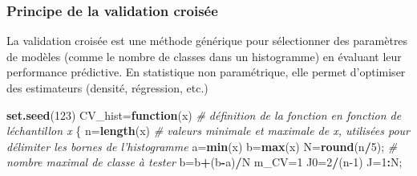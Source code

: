 \documentclass[
  12pt,
]{article}
\newenvironment{Shaded}{\begin{snugshade}}{\end{snugshade}}
\newcommand{\CommentTok}[1]{\textcolor[rgb]{0.56,0.35,0.01}{\textit{#1}}}
\newcommand{\ControlFlowTok}[1]{\textcolor[rgb]{0.13,0.29,0.53}{\textbf{#1}}}
\newcommand{\DecValTok}[1]{\textcolor[rgb]{0.00,0.00,0.81}{#1}}
\newcommand{\FunctionTok}[1]{\textcolor[rgb]{0.13,0.29,0.53}{\textbf{#1}}}
\newcommand{\NormalTok}[1]{#1}
\newcommand{\OtherTok}[1]{\textcolor[rgb]{0.56,0.35,0.01}{#1}}
\newcommand{\SpecialCharTok}[1]{\textcolor[rgb]{0.81,0.36,0.00}{\textbf{#1}}}
\begin{document}
\subsubsection{Principe de la validation
croisée}\label{principe-de-la-validation-croisuxe9e}

La validation croisée est une méthode générique pour sélectionner des
paramètres de modèles (comme le nombre de classes dans un histogramme)
en évaluant leur performance prédictive. En statistique non
paramétrique, elle permet d'optimiser des estimateurs (densité,
régression, etc.)

\begin{Shaded}
\begin{Highlighting}[]
\FunctionTok{set.seed}\NormalTok{(}\DecValTok{123}\NormalTok{)}
\NormalTok{CV\_hist}\OtherTok{=}\ControlFlowTok{function}\NormalTok{(x) }\CommentTok{\# définition de la fonction en fonction de l\textquotesingle{}échantillon x}
\NormalTok{\{}
\NormalTok{  n}\OtherTok{=}\FunctionTok{length}\NormalTok{(x)}
  \CommentTok{\# valeurs minimale et maximale de x, utilisées pour délimiter les bornes de l’histogramme}
\NormalTok{  a}\OtherTok{=}\FunctionTok{min}\NormalTok{(x)}
\NormalTok{  b}\OtherTok{=}\FunctionTok{max}\NormalTok{(x) }
\NormalTok{  N}\OtherTok{=}\FunctionTok{round}\NormalTok{(n}\SpecialCharTok{/}\DecValTok{5}\NormalTok{); }\CommentTok{\# nombre maximal de classe à tester}
\NormalTok{  b}\OtherTok{=}\NormalTok{b}\SpecialCharTok{+}\NormalTok{(b}\SpecialCharTok{{-}}\NormalTok{a)}\SpecialCharTok{/}\NormalTok{N}
\NormalTok{  m\_CV}\OtherTok{=}\DecValTok{1}
\NormalTok{  J0}\OtherTok{=}\DecValTok{2}\SpecialCharTok{/}\NormalTok{(n}\DecValTok{{-}1}\NormalTok{)}
\NormalTok{  J}\OtherTok{=}\DecValTok{1}\SpecialCharTok{:}\NormalTok{N;}
  

\end{Highlighting}
\end{Shaded}
\end{document}
